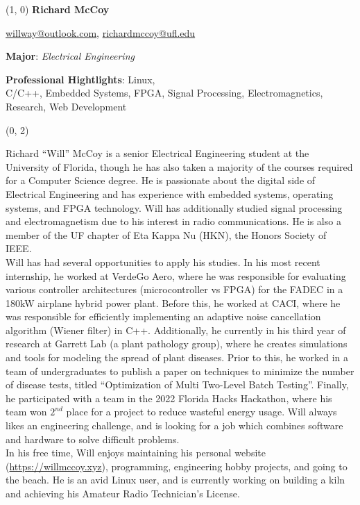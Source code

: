 \documentclass{article}
\begin{document}
\begin{textblock}{1}(1, 0)
\textbf{\Huge Richard McCoy}

\href{willway@outlook.com}{willway@outlook.com},
\href{richardmccoy@ufl.edu}{richardmccoy@ufl.edu}

\Large

\textbf{Major}: \textit{Electrical Engineering}

\textbf{Professional Hightlights}:
Linux, \\
C/C++,
Embedded Systems,
FPGA,
Signal Processing,
Electromagnetics,\\
Research,
Web Development
\end{textblock}

\begin{textblock}{2}(0, 2)

\large


Richard ``Will'' McCoy is a senior Electrical Engineering student at the University of Florida, though he has also taken a majority of the courses required for a Computer Science degree.
He is passionate about the digital side of Electrical Engineering and has experience with embedded systems, operating systems, and FPGA technology.
Will has additionally studied signal processing and electromagnetism due to his interest in radio communications.
He is also a member of the UF chapter of Eta Kappa Nu (HKN), the Honors Society of IEEE. \\

Will has had several opportunities to apply his studies.
In his most recent internship, he worked at VerdeGo Aero, where he was responsible for evaluating various controller architectures (microcontroller vs FPGA) for the FADEC in a 180kW airplane hybrid power plant.
Before this, he worked at CACI, where he was responsible for efficiently implementing an adaptive noise cancellation algorithm (Wiener filter) in C++.
Additionally, he currently in his third year of research at Garrett Lab (a plant pathology group), where he creates simulations and tools for modeling the spread of plant diseases.
Prior to this, he worked in a team of undergraduates to publish a paper on techniques to minimize the number of disease tests, titled ``Optimization of Multi Two-Level Batch Testing''.
Finally, he participated with a team in the 2022 Florida Hacks Hackathon, where his team won $2^{nd}$ place for a project to reduce wasteful energy usage.
Will always likes an engineering challenge, and is looking for a job which combines software and hardware to solve difficult problems. \\

In his free time, Will enjoys maintaining his personal website (\href{https://willmccoy.xyz}{https://willmccoy.xyz}), programming, engineering hobby projects, and going to the beach.
He is an avid Linux user, and is currently working on building a kiln and achieving his Amateur Radio Technician's License.

\end{textblock}
\end{document}
